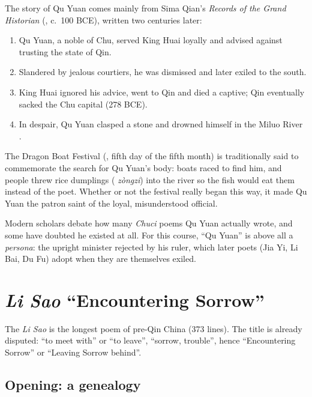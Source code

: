 The story of Qu Yuan comes mainly from Sima Qian's \emph{Records of the Grand Historian}
(, c.\ 100 BCE), written two centuries later:
\begin{enumerate}
  \item Qu Yuan, a noble of Chu, served King Huai  loyally and advised against
        trusting the state of Qin.
  \item Slandered by jealous courtiers, he was dismissed and later exiled to the south.
  \item King Huai ignored his advice, went to Qin and died a captive; Qin eventually
        sacked the Chu capital (278 BCE).
  \item In despair, Qu Yuan clasped a stone and drowned himself in the Miluo River
        .
\end{enumerate}

\begin{aside}
The Dragon Boat Festival (, fifth day of the fifth month) is traditionally
said to commemorate the search for Qu Yuan's body: boats raced to find him, and people
threw rice dumplings ( \emph{zòngzi}) into the river so the fish would eat them
instead of the poet. Whether or not the festival really began this way, it made Qu Yuan
the patron saint of the loyal, misunderstood official.
\end{aside}

\begin{remark}
Modern scholars debate how many \emph{Chuci} poems Qu Yuan actually wrote, and some have
doubted he existed at all. For this course, ``Qu Yuan'' is above all a \emph{persona}: the
upright minister rejected by his ruler, which later poets (Jia Yi, Li Bai, Du Fu) adopt
when they are themselves exiled.
\end{remark}

\section{\emph{Li Sao}  ``Encountering Sorrow''}

The \emph{Li Sao} is the longest poem of pre-Qin China (373 lines). The title is
already disputed:  ``to meet with'' or ``to leave'',  ``sorrow,
trouble'', hence ``Encountering Sorrow'' or ``Leaving Sorrow behind''.

\subsection{Opening: a genealogy}

